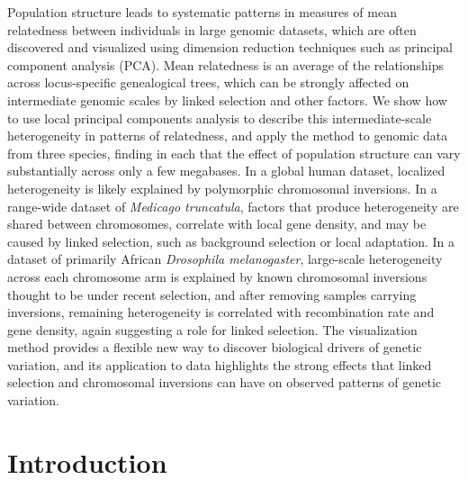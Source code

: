 \documentclass[11pt, oneside]{article}   	%
\renewcommand{\revpoint}[2]{\relax}
\begin{document}
Population structure leads to systematic patterns in measures of mean relatedness
between individuals in large genomic datasets,
which are often discovered and visualized using dimension reduction techniques such as principal component analysis (PCA).
Mean relatedness
is an average of the relationships across locus-specific genealogical trees,
which can be strongly affected on intermediate genomic scales by linked selection and other factors.
We show how to use local principal components analysis to describe this 
intermediate-scale heterogeneity in patterns of relatedness, \revpoint{AE}{1}
and apply the method to genomic data from three species,
finding in each that the effect of population structure 
can vary substantially across only a few megabases.
In a global human dataset, localized heterogeneity is likely explained by polymorphic chromosomal inversions.
In a range-wide dataset of \textit{Medicago truncatula},
factors that produce heterogeneity are shared between chromosomes,
correlate with local gene density,
and may be caused by linked selection, such as background selection or local adaptation.
In a dataset of primarily African \textit{Drosophila melanogaster}, large-scale heterogeneity across each chromosome arm
is explained by known chromosomal inversions thought to be under recent selection,
and after removing samples carrying inversions, remaining heterogeneity is correlated with recombination rate and gene density,
again suggesting a role for linked selection.
The visualization method provides a flexible new way to discover biological drivers of genetic variation,
and its application to data highlights the strong effects that linked selection and chromosomal inversions
can have on observed patterns of genetic variation.



\section{Introduction}
\end{document}
